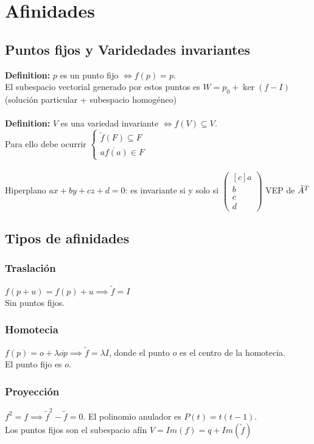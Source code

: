 \documentclass{article}
\begin{document}
\section{Afinidades}

\subsection{Puntos fijos y Varidedades invariantes}
\textbf{Definition:} $p$ es un punto fijo $\iff f(p) = p$. \\
El subespacio vectorial generado por estos puntos es $W = p_0+ \ker(f-I)$ (solución particular + subespacio homogéneo) \\
\\
\textbf{Definition:} $V$ es una variedad invariante $\iff f(V) \subseteq V$. \\
Para ello debe ocurrir $\begin{cases} \widetilde{f}(F) \subseteq F \\ \overline{af(a)} \in F \end{cases}$ \\
\\
Hiperplano $ax + by +cz +d = 0$: es invariante si y solo si $\begin{pmatrix}[c]
    a \\ b\\ c\\ d
\end{pmatrix}  $ VEP de $\Tilde{A}^T$



\subsection{Tipos de afinidades}
\subsubsection{Traslación}
$f(p+u) = f(p) + u \implies \widetilde{f} = I$ \\
Sin puntos fijos.

\subsubsection{Homotecia}
$f(p) = o + \lambda \overline{op} \implies \widetilde{f}=\lambda I$, donde el punto $o$ es el centro de la homotecia. \\
El punto fijo es $o$.

\subsubsection{Proyección}
$f^2 = f \implies \widetilde{f}^2-\widetilde{f} = 0$. 
El polinomio anulador es $P(t)=t(t-1)$. \\
Los puntos fijos son el subespacio afín $V=Im(f)=q + Im(\widetilde{f})$
\end{document}
